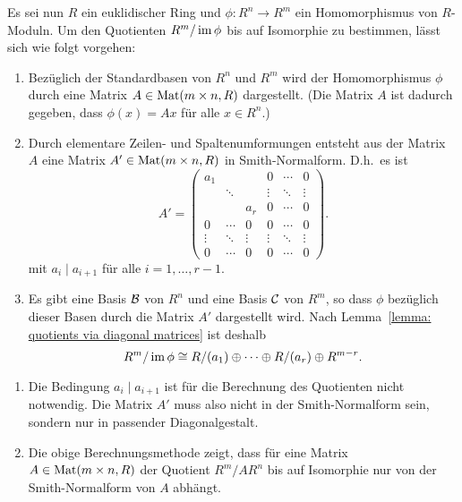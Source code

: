 \documentclass[a4paper,10pt,numbers=noenddot]{scrartcl}
\begin{document}
Es sei nun $R$ ein euklidischer Ring und $\phi \colon R^n \to R^m$ ein Homomorphismus von $R$-Moduln.
Um den Quotienten $R^m / \operatorname{im} \phi$ bis auf Isomorphie zu bestimmen, lässt sich wie folgt vorgehen:
\begin{enumerate}
  \item
    Bezüglich der Standardbasen von $R^n$ und $R^m$ wird der Homomorphismus $\phi$ durch eine Matrix $A \in \operatorname{Mat}(m \times n, R)$ dargestellt.
    (Die Matrix $A$ ist dadurch gegeben, dass $\phi(x) = Ax$ für alle $x \in R^n$.)
  \item
    Durch elementare Zeilen- und Spaltenumformungen entsteht aus der Matrix $A$ eine Matrix $A' \in \operatorname{Mat}(m \times n, R)$ in Smith-Normalform.
    D.h.\ es ist
    \[
        A'
      = \begin{pmatrix}
          a_1     &         &         & 0       & \cdots  & 0       \\
                  & \ddots  &         & \vdots  & \ddots  & \vdots  \\
                  &         & a_r     & 0       & \cdots  & 0       \\
          0       & \cdots  & 0       & 0       & \cdots  & 0       \\
          \vdots  & \ddots  & \vdots  & \vdots  & \ddots  & \vdots  \\
          0       & \cdots  & 0       & 0       & \cdots  & 0
        \end{pmatrix}.
    \]
    mit $a_i \mid a_{i+1}$ für alle $i = 1, \dotsc, r-1$.
  \item
    Es gibt eine Basis $\mathcal{B}$ von $R^n$ und eine Basis $\mathcal{C}$ von $R^m$, so dass $\phi$ bezüglich dieser Basen durch die Matrix $A'$ dargestellt wird.
    Nach Lemma~\ref{lemma: quotients via diagonal matrices} ist deshalb
    \[
            R^m / \operatorname{im} \phi
      \cong R/(a_1) \oplus \dotsb \oplus R/(a_r) \oplus R^{m-r}.
    \]
\end{enumerate}


\begin{remark}
  \begin{enumerate}
    \item
      Die Bedingung $a_i \mid a_{i+1}$ ist für die Berechnung des Quotienten nicht notwendig.
      Die Matrix $A'$ muss also nicht in der Smith-Normalform sein, sondern nur in passender Diagonalgestalt.
    \item
      Die obige Berechnungsmethode zeigt, dass für eine Matrix $A \in \operatorname{Mat}(m \times n, R)$ der Quotient $R^m / A R^n$ bis auf Isomorphie nur von der Smith-Normalform von $A$ abhängt.
  \end{enumerate}
\end{remark}
\end{document}
